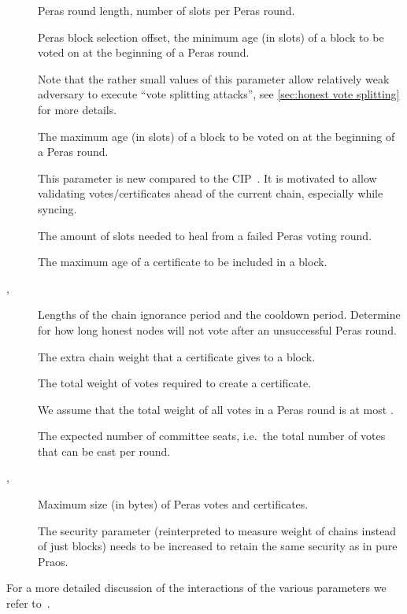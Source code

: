 \begin{description}
\item[\perasRoundSlots]
  Peras round length, number of slots per Peras round.
\item[\perasBlockMinSlots]
  Peras block selection offset, the minimum age (in slots) of a block to be voted on at the beginning of a Peras round.

  Note that the rather small values of this parameter allow relatively weak adversary to execute \enquote{vote splitting attacks}, see \cref{sec:honest vote splitting} for more details.
\item[\perasBlockMaxSlots]
  The maximum age (in slots) of a block to be voted on at the beginning of a Peras round.

  This parameter is new compared to the CIP~\cite{peras-cip}.
  It is motivated to allow validating votes/certificates ahead of the current chain, especially while syncing.
\item[\Theal{}]
  The amount of slots needed to heal from a failed Peras voting round.
\item[\perasCertMaxSlots]
  The maximum age of a certificate to be included in a block.
\item[\perasIgnoranceRounds, \perasCooldownRounds]
  Lengths of the chain ignorance period and the cooldown period.
  Determine for how long honest nodes will not vote after an unsuccessful Peras round.
\item[\perasBoost]
  The extra chain weight that a certificate gives to a block.
\item[\perasQuorum]
  The total weight of votes required to create a certificate.

  We assume that the total weight of all votes in a Peras round is at most \perasN{}.
\item[\perasN]
  The expected number of committee seats, i.e.\ the total number of votes that can be cast per round.
\item[\perasVoteSizeLimit, \perasCertSizeLimit]
  Maximum size (in bytes) of Peras votes and certificates.
\item[\kcp]
  The security parameter (reinterpreted to measure weight of chains instead of just blocks) needs to be increased to retain the same security as in pure Praos.
\end{description}

For a more detailed discussion of the interactions of the various parameters we refer to~\cite{peras-cip}.

